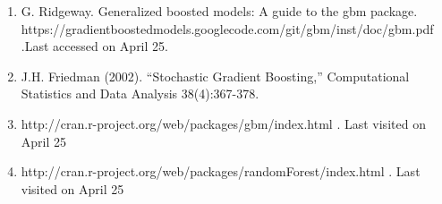 \documentclass[paper=a4, fontsize=11pt]{scrartcl}	%
\numberwithin{equation}{section}		%
\numberwithin{figure}{section}			%
\numberwithin{table}{section}				%
\begin{document}
\begin{enumerate}
\item
G. Ridgeway. Generalized boosted models: A guide to the gbm package. \\ 
https://gradientboostedmodels.googlecode.com/git/gbm/inst/doc/gbm.pdf .Last accessed on April 25.

\item
J.H. Friedman (2002). ``Stochastic Gradient Boosting,'' Computational Statistics and Data Analysis 38(4):367-378.

\item
http://cran.r-project.org/web/packages/gbm/index.html . Last visited on April 25

\item
http://cran.r-project.org/web/packages/randomForest/index.html . Last visited on April 25
\end{enumerate}

\end{document}
